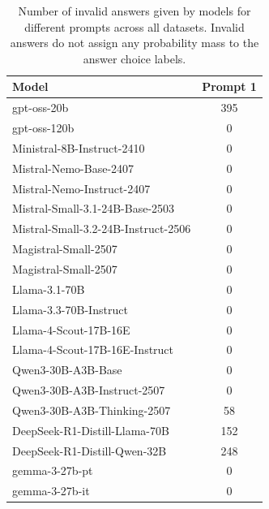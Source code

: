 \begin{table}[h]
\centering
\begin{tabular}{lc}
\hline
Model & Prompt 1 \\
\hline
gpt-oss-20b & 395 \\
gpt-oss-120b & 0 \\
Ministral-8B-Instruct-2410 & 0 \\
Mistral-Nemo-Base-2407 & 0 \\
Mistral-Nemo-Instruct-2407 & 0 \\
Mistral-Small-3.1-24B-Base-2503 & 0 \\
Mistral-Small-3.2-24B-Instruct-2506 & 0 \\
Magistral-Small-2507 & 0 \\
Magistral-Small-2507 & 0 \\
Llama-3.1-70B & 0 \\
Llama-3.3-70B-Instruct & 0 \\
Llama-4-Scout-17B-16E & 0 \\
Llama-4-Scout-17B-16E-Instruct & 0 \\
Qwen3-30B-A3B-Base & 0 \\
Qwen3-30B-A3B-Instruct-2507 & 0 \\
Qwen3-30B-A3B-Thinking-2507 & 58 \\
DeepSeek-R1-Distill-Llama-70B & 152 \\
DeepSeek-R1-Distill-Qwen-32B & 248 \\
gemma-3-27b-pt & 0 \\
gemma-3-27b-it & 0 \\
\hline
\end{tabular}
\caption{Number of invalid answers given by models for different prompts across all datasets. Invalid answers do not assign any probability mass to the answer choice labels.}
\label{tab:invalid_answers}
\end{table}